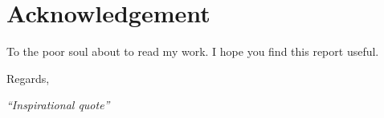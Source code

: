 
\chapter*{Acknowledgement} \label{cha:acknowledgement}


    To the poor soul about to read my work. I hope you find this report useful.




\vfill
Regards, \theauthor

\vspace{2em}
\begin{flushright}
    {\Large\slshape ``Inspirational quote'' \par}
\end{flushright}